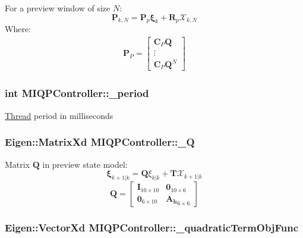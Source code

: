 \-For a preview window of size $N$\-: \[ \mathbf{P}_{k,N} = \mathbf{P}_p \mathbf{\xi}_k + \mathbf{R}_p \mathcal{X}_{k,N} \] \-Where\-: \begin{align*} \mathbf{P}_P = \left[\begin{array}{c} \mathbf{C}_P \mathbf{Q} \\ \vdots\\ \mathbf{C}_P \mathbf{Q}^N \end{array}\right] \end{align*} \hypertarget{classMIQPController_aed2ce53008e32e64e107398d85e75170}{
\subsubsection[{\-\_\-period}]{\setlength{\rightskip}{0pt plus 5cm}int {\bf \-M\-I\-Q\-P\-Controller\-::\-\_\-period}}}\label{classMIQPController_aed2ce53008e32e64e107398d85e75170}
\hyperlink{classThread}{\-Thread} period in milliseconds \hypertarget{classMIQPController_ac6404f74d6002d6a0ca4bd2d0b41d548}{
\subsubsection[{\-\_\-\-Q}]{\setlength{\rightskip}{0pt plus 5cm}\-Eigen\-::\-Matrix\-Xd {\bf \-M\-I\-Q\-P\-Controller\-::\-\_\-\-Q}}}\label{classMIQPController_ac6404f74d6002d6a0ca4bd2d0b41d548}
\-Matrix $\mathbf{Q}$ in preview state model\-: \[ \mathbf{\xi}_{k+1|k} = \mathbf{Q} \xi_{k|k} + \mathbf{T}\mathcal{X}_{k+1|k} \] \[ \mathbf{Q} = \left[\begin{array}{cc} \mathbf{I}_{10\times10} & \mathbf{0}_{10\times6}\\ \mathbf{0}_{6\times10} & \mathbf{A_h}_{6\times6} \end{array}\right] \] \hypertarget{classMIQPController_a532459bb659a1cc39d449fdf3f81c63f}{
\subsubsection[{\-\_\-quadratic\-Term\-Obj\-Func}]{\setlength{\rightskip}{0pt plus 5cm}\-Eigen\-::\-Vector\-Xd {\bf \-M\-I\-Q\-P\-Controller\-::\-\_\-quadratic\-Term\-Obj\-Func}}}\label{classMIQPController_a532459bb659a1cc39d449fdf3f81c63f}
